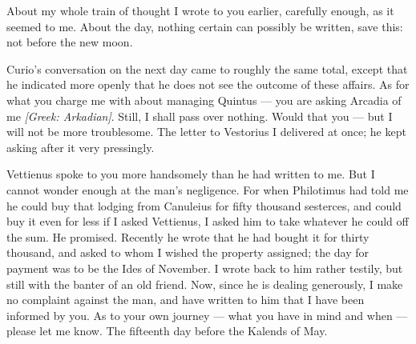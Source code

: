 

 About my whole train of thought I wrote to you earlier, carefully enough, as it seemed to me. About the day, nothing certain can possibly be written, save this: not before the new moon.

 Curio's conversation on the next day came to roughly the same total, except that he indicated more openly that he does not see the outcome of these affairs. As for what you charge me with about managing Quintus --- you are asking Arcadia of me \textit{[Greek: Arkadian]}. Still, I shall pass over nothing. Would that you --- but I will not be more troublesome. The letter to Vestorius I delivered at once; he kept asking after it very pressingly.

 Vettienus spoke to you more handsomely than he had written to me. But I cannot wonder enough at the man's negligence. For when Philotimus had told me he could buy that lodging from Canuleius for fifty thousand sesterces, and could buy it even for less if I asked Vettienus, I asked him to take whatever he could off the sum. He promised. Recently he wrote that he had bought it for thirty thousand, and asked to whom I wished the property assigned; the day for payment was to be the Ides of November. I wrote back to him rather testily, but still with the banter of an old friend. Now, since he is dealing generously, I make no complaint against the man, and have written to him that I have been informed by you. As to your own journey --- what you have in mind and when --- please let me know. The fifteenth day before the Kalends of May.
